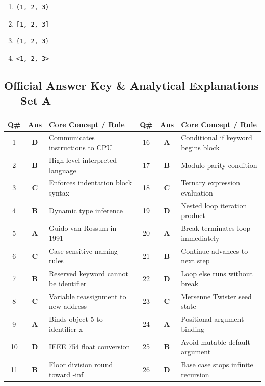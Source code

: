 \begin{enumerate}[label=(\alph*),topsep=2pt,itemsep=1pt,partopsep=0pt,parsep=0pt]
    \item \relax \texttt{(1, 2, 3)}
    \item \relax \texttt{[1, 2, 3]}
    \item \relax \texttt{\{1, 2, 3\}}
    \item \relax \texttt{<1, 2, 3>}
\end{enumerate}
\vspace{{2mm}}

\newpage
\subsection*{Official Answer Key \& Analytical Explanations --- Set A}

\begin{center}
\begin{tabularx}{0.96\textwidth}{c c X c c X}
\toprule
\textbf{Q\#} & \textbf{Ans} & \textbf{Core Concept / Rule} & \textbf{Q\#} & \textbf{Ans} & \textbf{Core Concept / Rule} \\
\midrule
1 & \textbf{D} & Communicates instructions to CPU & 16 & \textbf{A} & Conditional if keyword begins block \\
2 & \textbf{B} & High-level interpreted language & 17 & \textbf{B} & Modulo parity condition \\
3 & \textbf{C} & Enforces indentation block syntax & 18 & \textbf{C} & Ternary expression evaluation \\
4 & \textbf{B} & Dynamic type inference & 19 & \textbf{D} & Nested loop iteration product \\
5 & \textbf{A} & Guido van Rossum in 1991 & 20 & \textbf{A} & Break terminates loop immediately \\
6 & \textbf{C} & Case-sensitive naming rules & 21 & \textbf{B} & Continue advances to next step \\
7 & \textbf{B} & Reserved keyword cannot be identifier & 22 & \textbf{D} & Loop else runs without break \\
8 & \textbf{C} & Variable reassignment to new address & 23 & \textbf{C} & Mersenne Twister seed state \\
9 & \textbf{A} & Binds object 5 to identifier x & 24 & \textbf{A} & Positional argument binding \\
10 & \textbf{D} & IEEE 754 float conversion & 25 & \textbf{B} & Avoid mutable default argument \\
11 & \textbf{B} & Floor division round toward -inf & 26 & \textbf{D} & Base case stops infinite recursion \\

\end{tabularx}
\end{center}
